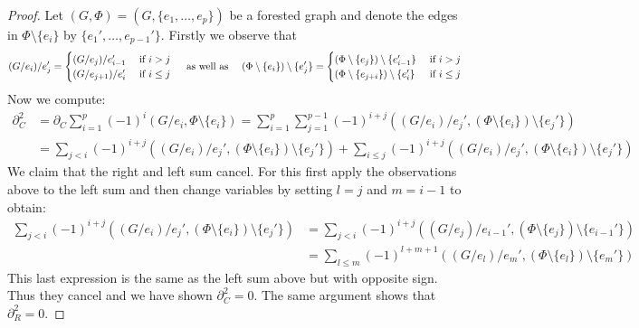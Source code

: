 \begin{proof}
	Let $(G,\Phi) = (G, \{e_1,\ldots,e_{p}\})$ be a forested graph and denote the edges in $\Phi \setminus \{e_{i}\}$ by $\{e_1',\ldots,e_{p-1}'\}$.
	Firstly we observe that 
	\[
		(G / e_{i}) /  e_{j}' = \begin{cases}
			(G / e_{j}) / e_{i-1}' & \text{ if } i > j\\
			(G / e_{j+1}) / e_{i}' & \text{ if } i \leq j
		\end{cases}
		\qq{ as well as }
		(\Phi \setminus \{e_{i}\}) \setminus \{e_{j}'\}  = \begin{cases}	
			(\Phi \setminus \{e_{j}\}) \setminus \{e_{i-1}'\} & \text{ if } i > j\\
			(\Phi \setminus \{e_{j+i}\}) \setminus \{e_{i}'\} & \text{ if } i \leq j
		\end{cases}
	\]
	Now we compute:
	\begin{align*}
		\partial_{C}^2 &= \partial_{C} \sum_{i=1}^{p} (-1)^{i}(G / e_{i}, \Phi \setminus \{e_{i}\})
		=  \sum_{i=1}^{p} \sum_{j=1}^{p-1} (-1)^{i+j}((G / e_{i}) / e_{j}', (\Phi \setminus \{e_{i}\} ) \setminus \{e_{j}'\})  \\
					   &= \sum_{j < i} (-1)^{i+j} ((G / e_{i}) / e_{j}', (\Phi \setminus \{e_{i}\} ) \setminus \{e_{j}'\}) + \sum_{i \leq j} (-1)^{i+j}
					   ((G / e_{i}) / e_{j}', (\Phi \setminus \{e_{i}\} ) \setminus \{e_{j}'\}) 
	\end{align*}
	We claim that the right and left sum cancel. For this first apply the observations above to the left sum and then change variables by setting $l = j$ and  $m = i-1$ to obtain:
	\begin{align*}
		\sum_{j < i} (-1)^{i+j} ((G / e_{i}) / e_{j}', (\Phi \setminus \{e_{i}\}) \setminus \{e_{j}'\} ) &= 
		\sum_{j < i} (-1)^{i+j}((G / e_{j}) / e_{i-1}', (\Phi \setminus \{e_{j}\}) \setminus \{e_{i-1}'\} ) \\ 
		&= \sum_{l \leq m} (-1)^{l+m+1} ((G / e_{l}) / e_{m}', (\Phi \setminus \{e_{l}\}) \setminus \{e_{m}'\} ) 
	\end{align*}
	This last expression is the same as the left sum above but with opposite sign. Thus they cancel and we have shown $\partial_{C}^2 = 0$.
	The same argument shows that $\partial_{R}^2 = 0$.


\end{proof}
